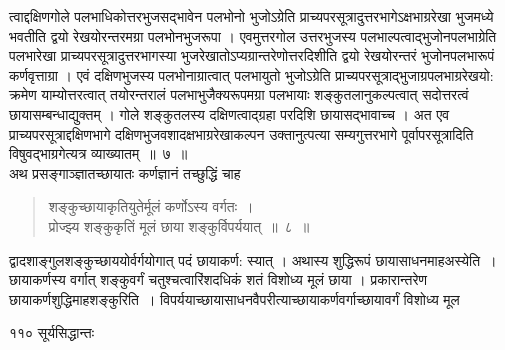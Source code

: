 \documentclass[11pt, openany]{book}
\begin{document}
\begin{sloppypar}

\noindent त्वाद्दक्षिणगोले पलभाधिकोत्तरभुजसद्भावेन पलभोनो भुजोऽग्रेति प्राच्यपरसूत्रादुत्तरभागेऽक्षभाग्ररेखा भुजमध्ये भवतीति द्वयो रेखयोरन्तरमग्रा पलभोनभुजरूपा । एवमुत्तरगोल उत्तरभुजस्य पलभाल्पत्वाद्भुजोनपलभाग्रेति पलभारेखा प्राच्यपरसूत्रादुत्तरभागस्या भुजरेखातोऽप्यग्रान्तरेणोत्तरदिशीति द्वयो रेखयोरन्तरं भुजोनपलभारूपं कर्णवृत्ताग्रा । एवं दक्षिणभुजस्य पलभोनाग्रात्वात् पलभायुतो भुजोऽग्रेति प्राच्यपरसूत्राद्भुजाग्रपलभाग्ररेखयो: क्रमेण याम्योत्तरत्वात् तयोरन्तरालं पलभाभुजैक्यरूपमग्रा पलभायाः शङ्कुतलानुकल्पत्वात् सदोत्तरत्वं छायासम्बन्धाद्युक्तम् । गोले शङ्कुतलस्य दक्षिणत्वाद्ग्रहा परदिशि छायासद्भावाच्च । अत एव प्राच्यपरसूत्राद्दक्षिणभागे दक्षिणभुजवशादक्षभाग्ररेखाकल्पन उक्तानुत्पत्या सम्यगुत्तरभागे पूर्वापरसूत्रादिति विषुवद्भाग्रगेत्यत्र व्याख्यातम्~॥~७~॥\\
\noindent अथ प्रसङ्गाञ्ज्ञातच्छायातः कर्णज्ञानं तच्छुद्धिं चाह\textendash
\end{sloppypar}
\begin{quote}

  {\ssi शङ्कुच्छायाकृतियुतेर्मूलं कर्णोऽस्य वर्गतः~।\\
 प्रोज्झ्य शङ्कुकृतिं मूलं छाया शङ्कुर्विपर्ययात्~॥~८~॥}
\end{quote}
\begin{sloppypar}
 द्वादशाङ्गुलशङ्कुच्छाययोर्वर्गयोगात् पदं छायाकर्ण: स्यात् । अथास्य शुद्धिरूपं छायासाधनमाह\textendash अस्येति~। छायाकर्णस्य वर्गात् शङ्कुवर्गं चतुश्चत्वारिंशदधिकं शतं विशोध्य मूलं छाया । प्रकारान्तरेण छायाकर्णशुद्धिमाह\textendash शङ्कुरिति~। विपर्ययाच्छायासाधनवैपरीत्याच्छायाकर्णवर्गाच्छायावर्गं विशोध्य मूल\textendash
\end{sloppypar}

\newpage


\noindent ११० \hspace{4cm} सूर्यसिद्धान्तः 
\vspace{1cm}
\end{document}
